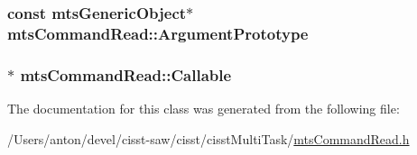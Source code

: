 \subsubsection[{Argument\+Prototype}]{\setlength{\rightskip}{0pt plus 5cm}const {\bf mts\+Generic\+Object}$\ast$ mts\+Command\+Read\+::\+Argument\+Prototype\hspace{0.3cm}{\ttfamily [protected]}}\label{classmts_command_read_ab99241122421dce8a29351f19b97e8c0}
\hypertarget{classmts_command_read_aa99a8b6be2493dfffc746078347ae0c8}{}
\subsubsection[{Callable}]{$\ast$ mts\+Command\+Read\+::\+Callable\hspace{0.3cm}{\ttfamily [protected]}}\label{classmts_command_read_aa99a8b6be2493dfffc746078347ae0c8}


The documentation for this class was generated from the following file\+:\begin{DoxyCompactItemize}
\item 
/\+Users/anton/devel/cisst-\/saw/cisst/cisst\+Multi\+Task/\hyperlink{mts_command_read_8h}{mts\+Command\+Read.\+h}\end{DoxyCompactItemize}
